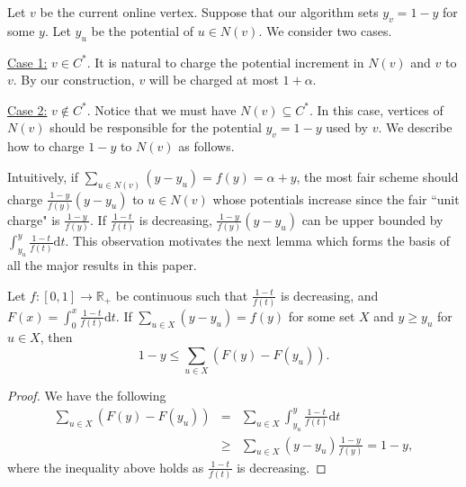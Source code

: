 \documentclass{article}
\begin{document}
Let $v$ be the current online vertex. Suppose that our algorithm sets $y_v=1-y$ for some $y$. 
Let $y_u$ be the potential of $u\in N(v)$.
We consider two cases.

\underline{Case 1:} $v\in C^*$. 
It is natural to charge the potential increment in $N(v)$ and $v$ to $v$. 
By our construction, $v$ will be charged at most $1+\alpha$.

\underline{Case 2:} $v\notin C^*$. Notice that we must have $N(v)\subseteq C^*$. In this case, vertices of $N(v)$ should be responsible for the potential $y_v=1-y$ used by $v$.
We describe how to charge $1-y$ to $N(v)$ as follows.

Intuitively, if $\sum_{u\in N(v)} (y-y_u)=f(y)=\alpha + y$, the most fair scheme should charge $\frac{1-y}{f(y)}(y-y_u)$ to $u \in N(v)$ whose potentials increase
since  the fair ``unit charge" is $\frac{1-y}{f(y)}$. 
If $\frac{1-t}{f(t)}$ is decreasing, $\frac{1-y}{f(y)}(y-y_u)$ can be upper bounded by $\int_{y_u}^y \frac{1-t}{f(t)}\mathrm{d}t$. This observation motivates the next lemma which forms the basis of all the major results in this paper.
\begin{lemma}
\label{lem:charging}
Let $f:[0,1]\longrightarrow\mathbb{R}_+$ be continuous such that $\frac{1-t}{f(t)}$ is decreasing, and $F(x)=\int_0^x  \frac{1-t}{f(t)}\mathrm{d}t$. If $\sum_{u\in X} (y-y_u)= f(y)$ for some set $X$ and $y\geq y_u$ for $u\in X$, then
$$1-y\leq \sum_{u\in X} \left(F(y)-F(y_u)\right).$$
\end{lemma}
\begin{proof}
We have the following
\begin{eqnarray*}
\sum_{u\in X}\left(F(y)-F(y_u)\right) & = & \sum_{u\in X}\int_{y_u}^y  \frac{1-t}{f(t)}\mathrm{d}t\\
             & \geq &  \sum_{u\in X}(y-y_u)\frac{1-y}{f(y)}=1-y,
\end{eqnarray*}
where the inequality above holds as $\frac{1-t}{f(t)}$ is decreasing.
\end{proof}
\end{document}
